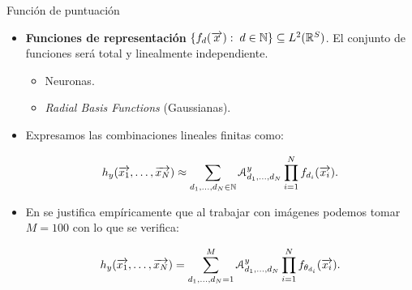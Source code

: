 \begin{frame}{Función de puntuación}

	\begin{itemize}
		\item \textbf{Funciones de representación} $\{ f_d(\overrightarrow{x}): \; d \in \mathbb{N} \} \subseteq L^2(\mathbb{R}^S)$. El conjunto de funciones será total y linealmente independiente.
		      \begin{itemize}
			      \item Neuronas.
			      \item \textit{Radial Basis Functions} (Gaussianas).
		      \end{itemize}
		\item Expresamos las combinaciones lineales finitas como:

		      \begin{equation} \label{eq:hipotesis_en_general}
			      h_y(\overrightarrow{x_1}, \ldots, \overrightarrow{x_N}) \approx \sum_{d_1, \ldots, d_N \in \mathbb{N}} \mathcal{A}^y_{d_1, \ldots, d_N} \prod_{i = 1}^N f_{d_i}(\overrightarrow{x_i}).
		      \end{equation}
		\item En \cite{matematicas:principal} se justifica empíricamente que al trabajar con imágenes podemos tomar $M=100$ con lo que se verifica:

		      \begin{equation} \label{eq:puntuacion_general}
			      h_y(\overrightarrow{x_1}, \ldots, \overrightarrow{x_N}) = \sum_{d_1, \ldots, d_N = 1}^{M} \mathcal{A}^y_{d_1, \ldots, d_N} \prod_{i = 1}^N f_{\theta_{d_i}}(\overrightarrow{x_i}).
		      \end{equation}
	\end{itemize}

\end{frame}

